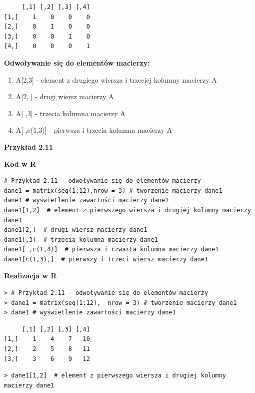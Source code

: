 \documentclass[12pt,B5paper,]{book}
\begin{document}
\begin{verbatim}
     [,1] [,2] [,3] [,4]
[1,]    1    0    0    0
[2,]    0    1    0    0
[3,]    0    0    1    0
[4,]    0    0    0    1
\end{verbatim}

\vspace{0.8cm}

\textbf{Odwoływanie się do elementów macierzy:}

\begin{enumerate}
\def\labelenumi{\alph{enumi})}
\item
  A{[}2,3{]} - element z drugiego wiersza i trzeciej kolumny macierzy A
\item
  A{[}2, {]} - drugi wiersz macierzy A
\item
  A{[} ,3{]} - trzecia kolumna macierzy A
\item
  A{[} ,c(1,3){]} - pierwsza i trzecia kolumna macierzy A
\end{enumerate}

\textbf{Przykład 2.11}

\textbf{Kod w R}

\begin{verbatim}
# Przykład 2.11 - odwoływanie się do elementów macierzy
dane1 = matrix(seq(1:12),nrow = 3) # tworzenie macierzy dane1
dane1 # wyświetlenie zawartości macierzy dane1
dane1[1,2]  # element z pierwszego wiersza i drugiej kolumny macierzy dane1
dane1[2,]  # drugi wiersz macierzy dane1
dane1[,3]  # trzecia kolumna macierzy dane1
dane1[ ,c(1,4)]  # pierwsza i czwarta kolumna macierzy dane1
dane1[c(1,3),]  # pierwszy i trzeci wiersz macierzy dane1
\end{verbatim}

\vspace{0.8cm}

\textbf{Realizacja w R}

\begin{verbatim}
> # Przykład 2.11 - odwoływanie się do elementów macierzy
> dane1 = matrix(seq(1:12),  nrow = 3) # tworzenie macierzy dane1
> dane1 # wyświetlenie zawartości macierzy dane1
\end{verbatim}

\begin{verbatim}
     [,1] [,2] [,3] [,4]
[1,]    1    4    7   10
[2,]    2    5    8   11
[3,]    3    6    9   12
\end{verbatim}

\begin{verbatim}
> dane1[1,2]  # element z pierwszego wiersza i drugiej kolumny macierzy dane1
\end{verbatim}
\end{document}
